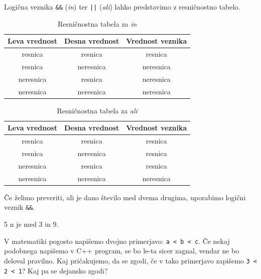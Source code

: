\documentclass{book}
\begin{document}
Logična veznika \verb+&&+ (\emph{in}) ter \verb+||+ (\emph{ali}) lahko
predstavimo z resničnostno tabelo.

\begin{table}[h!]
  \centering
  \caption{Resničnostna tabela za \textit{in}}
  \vspace{0.1cm}
  \begin{tabular}{c|c|c}
	Leva vrednost & Desna vrednost & Vrednost veznika \\
	\hline
	resnica & resnica & resnica \\
	resnica & neresnica & neresnica \\
	neresnica & resnica & neresnica \\
	neresnica & neresnica & neresnica
  \end{tabular}
\end{table}

\begin{table}[h!]
  \centering
  \caption{Resničnostna tabela za \textit{ali}}
  \vspace{0.1cm}
  \begin{tabular}{c|c|c}
	Leva vrednost & Desna vrednost & Vrednost veznika \\
	\hline
	resnica & resnica & resnica \\
	resnica & neresnica & resnica \\
	neresnica & resnica & resnica \\
	neresnica & neresnica & neresnica
  \end{tabular}
\end{table}

\begin{examples}

Če želimo preveriti, ali je dano število med dvema drugima, uporabimo
logični veznik \verb+&&+.


\begin{inout}
5
\tcblower
n je med 3 in 9.
\end{inout}

\end{examples}

\begin{errors}
  V matematiki pogosto napišemo dvojno primerjavo: \verb+a < b < c+.
  Če nekaj podobnega napišemo v C++ program, se bo le-ta sicer zagnal, vendar
  ne bo deloval pravilno. Kaj pričakujemo, da se zgodi, če v tako primerjavo
  zapišemo \verb+3 < 2 < 1+? Kaj pa se dejansko zgodi?
\end{errors}
\end{document}
